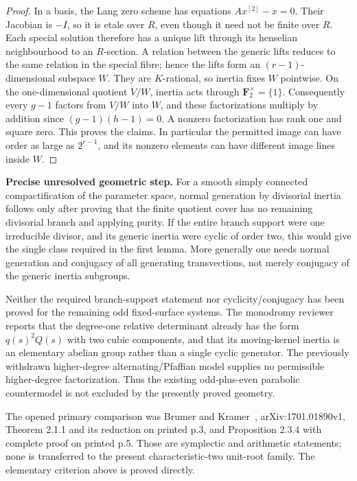\begin{proof}
In a basis, the Lang zero scheme has equations $A x^{[2]}-x=0$.
Their Jacobian is $-I$, so it is etale over $R$, even though it need
not be finite over $R$. Each special solution therefore has a unique
lift through its henselian neighbourhood to an $R$-section. A relation
between the generic lifts reduces to the same relation in the special
fibre; hence the lifts form an $(r-1)$-dimensional subspace $W$.
They are $K$-rational, so inertia fixes $W$ pointwise. On the
one-dimensional quotient $V/W$, inertia acts through
$\mathbf F_2^\times=\{1\}$. Consequently every $g-1$ factors from
$V/W$ into $W$, and these factorizations multiply by addition since
$(g-1)(h-1)=0$. A nonzero factorization has rank one and square zero.
This proves the claims. In particular the permitted image can have
order as large as $2^{r-1}$, and its nonzero elements can have different
image lines inside $W$.

\end{proof}

\par\smallskip\noindent\textbf{Precise unresolved geometric step.}
For a smooth simply connected compactification of the parameter space,
normal generation by divisorial inertia follows only after proving
that the finite quotient cover has no remaining divisorial branch and
applying purity. If the entire branch support were one irreducible
divisor, and its generic inertia were cyclic of order two, this would
give the single class required in the first lemma. More generally one
needs normal generation and conjugacy of all generating transvections,
not merely conjugacy of the generic inertia subgroups.

Neither the required branch-support statement nor cyclicity/conjugacy
has been proved for the remaining odd fixed-surface systems.
The monodromy reviewer reports that the degree-one relative determinant
already has the form $q(s)^2Q(s)$ with two cubic components, and that its
moving-kernel inertia is an elementary abelian group rather than a
single cyclic generator. The previously withdrawn higher-degree
alternating/Pfaffian model supplies no permissible higher-degree
factorization. Thus the existing odd-plus-even parabolic countermodel
is not excluded by the presently proved geometry.

The opened primary comparison was Brumer and Kramer~\cite{BrumerKramer2018LargeImage}, arXiv:1701.01890v1,
Theorem 2.1.1 and its reduction on printed p.3, and Proposition 2.3.4
with complete proof on printed p.5. Those are symplectic and arithmetic
statements; none is transferred to the present characteristic-two
unit-root family. The elementary criterion above is proved directly.

